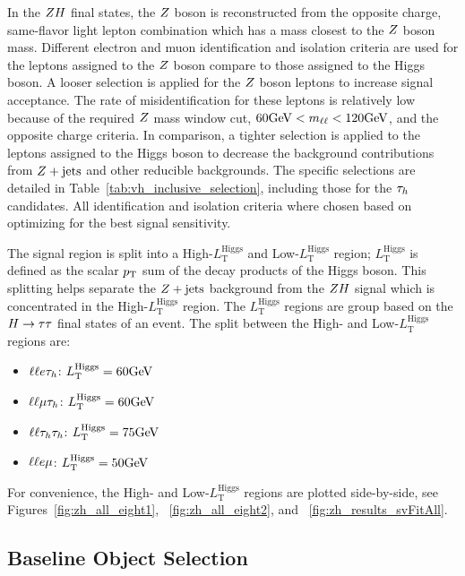 In the $ZH$ final states, the $Z$ boson is reconstructed from the opposite charge, same-flavor
light lepton combination which has a mass closest to the $Z$ boson mass. Different 
electron and muon identification and isolation criteria are used for the leptons 
assigned to the $Z$ boson compare to those assigned to the Higgs boson. A looser
selection is applied for the $Z$ boson leptons to increase signal acceptance. The
rate of misidentification for these leptons is relatively low because of the required $Z$ mass
window cut, $60\mathrm{GeV} < m_{\ell\ell} < 120\mathrm{GeV}$, and the opposite charge criteria.
In comparison, a tighter selection is applied to the leptons assigned to the Higgs boson to
decrease the background contributions from $Z+\textrm{jets}$ and other reducible
backgrounds. The specific selections are detailed in Table~\ref{tab:vh_inclusive_selection},
including those for the $\tau_{h}$ candidates. All identification and isolation criteria
where chosen based on optimizing for the best signal sensitivity.

The signal region is split into a High-$L_{\text{T}}^{\textrm{Higgs}}$ and Low-$L_{\text{T}}^{\textrm{Higgs}}$
region; $L_{\text{T}}^{\textrm{Higgs}}$ is defined as the scalar $p_\mathrm{T}$ sum of the decay 
products of the Higgs boson. This splitting helps separate the $Z+\text{jets}$
background from the $ZH$ signal which is concentrated in the
High-$L_{\text{T}}^{\textrm{Higgs}}$ region.
The $L_{\text{T}}^{\textrm{Higgs}}$ regions are group based on the $H\to\tau\tau$ final 
states of an event. The split between the High- and Low-$L_{\text{T}}^{\textrm{Higgs}}$
regions are:
\begin{itemize}
\item $\ell\ell e\tau_{h}$: $L_{\text{T}}^{\textrm{Higgs}} = 60\mathrm{GeV}$
\item $\ell\ell\mu\tau_{h}$: $L_{\text{T}}^{\textrm{Higgs}} = 60\mathrm{GeV}$
\item $\ell\ell\tau_{h}\tau_{h}$: $L_{\text{T}}^{\textrm{Higgs}} = 75\mathrm{GeV}$
\item $\ell\ell e\mu$: $L_{\text{T}}^{\textrm{Higgs}} = 50\mathrm{GeV}$
\end{itemize}
For convenience, the High- and Low-$L_{\text{T}}^{\textrm{Higgs}}$ regions are plotted
side-by-side, see Figures~\ref{fig:zh_all_eight1}, ~\ref{fig:zh_all_eight2}, 
and ~\ref{fig:zh_results_svFitAll}.



\subsection{Baseline Object Selection}
\label{sec:vh_obj_selection}

